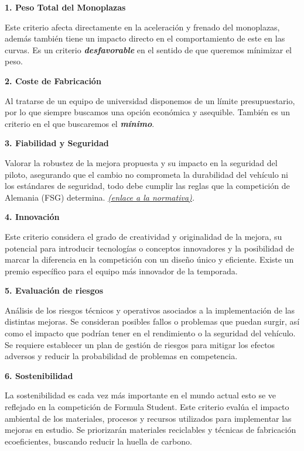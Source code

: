 \documentclass[
]{article}
\begin{document}
\textbf{1. Peso Total del Monoplazas}

Este criterio afecta directamente en la aceleración y frenado del
monoplazas, además también tiene un impacto directo en el comportamiento
de este en las curvas. Es un criterio \textbf{\emph{desfavorable}} en el
sentido de que queremos mínimizar el peso.

\textbf{2. Coste de Fabricación}

Al tratarse de un equipo de universidad disponemos de un límite
presupuestario, por lo que siempre buscamos una opción económica y
asequible. También es un criterio en el que buscaremos el
\textbf{\emph{mínimo}}.

\textbf{3. Fiabilidad y Seguridad}

Valorar la robustez de la mejora propuesta y su impacto en la seguridad
del piloto, asegurando que el cambio no comprometa la durabilidad del
vehículo ni los estándares de seguridad, todo debe cumplir las reglas
que la competición de Alemania (FSG) determina.
\href{https://www.formulastudent.de/fileadmin/user_upload/all/2025/rules/FS-Rules_2025_v1.0.pdf}{\emph{(enlace
a la normativa)}}\emph{.}

\textbf{4. Innovación}

Este criterio considera el grado de creatividad y originalidad de la
mejora, su potencial para introducir tecnologías o conceptos innovadores
y la posibilidad de marcar la diferencia en la competición con un diseño
único y eficiente. Existe un premio específico para el equipo más
innovador de la temporada.

\textbf{5. Evaluación de riesgos}

Análisis de los riesgos técnicos y operativos asociados a la
implementación de las distintas mejoras. Se consideran posibles fallos o
problemas que puedan surgir, así como el impacto que podrían tener en el
rendimiento o la seguridad del vehículo. Se requiere establecer un plan
de gestión de riesgos para mitigar los efectos adversos y reducir la
probabilidad de problemas en competencia.

\textbf{6. Sostenibilidad}

La sostenibilidad es cada vez más importante en el mundo actual esto se
ve reflejado en la competición de Formula Student. Este criterio evalúa
el impacto ambiental de los materiales, procesos y recursos utilizados
para implementar las mejoras en estudio. Se priorizarán materiales
reciclables y técnicas de fabricación ecoeficientes, buscando reducir la
huella de carbono.
\end{document}
